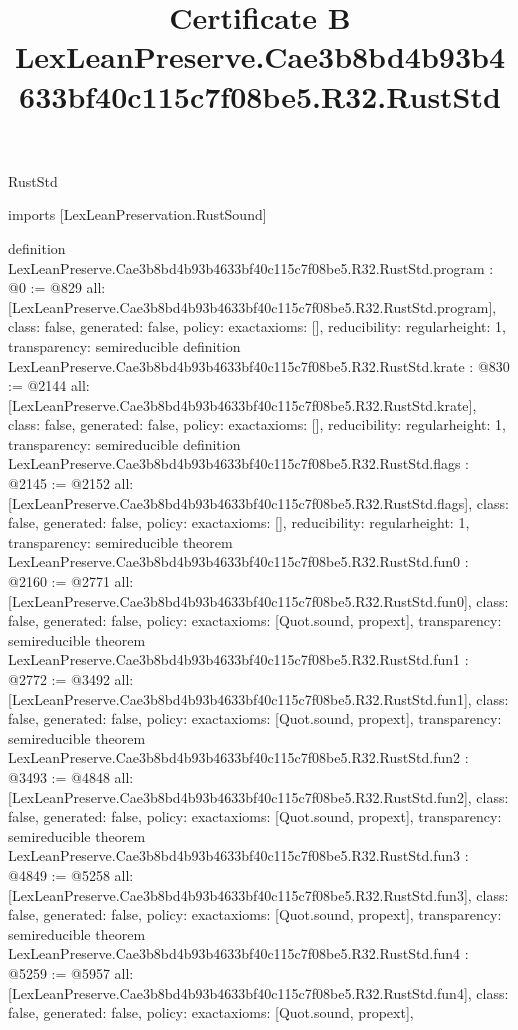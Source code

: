 \begin{lexlean}{RustStd}
\title{Certificate B LexLeanPreserve.Cae3b8bd4b93b4633bf40c115c7f08be5.R32.RustStd}
\begin{coremodule}
imports [LexLeanPreservation.RustSound]

definition LexLeanPreserve.Cae3b8bd4b93b4633bf40c115c7f08be5.R32.RustStd.program : @0 := @829 {
  all: [LexLeanPreserve.Cae3b8bd4b93b4633bf40c115c7f08be5.R32.RustStd.program],
  class: false,
  generated: false,
  policy: exact{axioms: []},
  reducibility: regular{height: 1},
  transparency: semireducible
}
definition LexLeanPreserve.Cae3b8bd4b93b4633bf40c115c7f08be5.R32.RustStd.krate : @830 := @2144 {
  all: [LexLeanPreserve.Cae3b8bd4b93b4633bf40c115c7f08be5.R32.RustStd.krate],
  class: false,
  generated: false,
  policy: exact{axioms: []},
  reducibility: regular{height: 1},
  transparency: semireducible
}
definition LexLeanPreserve.Cae3b8bd4b93b4633bf40c115c7f08be5.R32.RustStd.flags : @2145 := @2152 {
  all: [LexLeanPreserve.Cae3b8bd4b93b4633bf40c115c7f08be5.R32.RustStd.flags],
  class: false,
  generated: false,
  policy: exact{axioms: []},
  reducibility: regular{height: 1},
  transparency: semireducible
}
theorem LexLeanPreserve.Cae3b8bd4b93b4633bf40c115c7f08be5.R32.RustStd.fun0 : @2160 := @2771 {
  all: [LexLeanPreserve.Cae3b8bd4b93b4633bf40c115c7f08be5.R32.RustStd.fun0],
  class: false,
  generated: false,
  policy: exact{axioms: [Quot.sound, propext]},
  transparency: semireducible
}
theorem LexLeanPreserve.Cae3b8bd4b93b4633bf40c115c7f08be5.R32.RustStd.fun1 : @2772 := @3492 {
  all: [LexLeanPreserve.Cae3b8bd4b93b4633bf40c115c7f08be5.R32.RustStd.fun1],
  class: false,
  generated: false,
  policy: exact{axioms: [Quot.sound, propext]},
  transparency: semireducible
}
theorem LexLeanPreserve.Cae3b8bd4b93b4633bf40c115c7f08be5.R32.RustStd.fun2 : @3493 := @4848 {
  all: [LexLeanPreserve.Cae3b8bd4b93b4633bf40c115c7f08be5.R32.RustStd.fun2],
  class: false,
  generated: false,
  policy: exact{axioms: [Quot.sound, propext]},
  transparency: semireducible
}
theorem LexLeanPreserve.Cae3b8bd4b93b4633bf40c115c7f08be5.R32.RustStd.fun3 : @4849 := @5258 {
  all: [LexLeanPreserve.Cae3b8bd4b93b4633bf40c115c7f08be5.R32.RustStd.fun3],
  class: false,
  generated: false,
  policy: exact{axioms: [Quot.sound, propext]},
  transparency: semireducible
}
theorem LexLeanPreserve.Cae3b8bd4b93b4633bf40c115c7f08be5.R32.RustStd.fun4 : @5259 := @5957 {
  all: [LexLeanPreserve.Cae3b8bd4b93b4633bf40c115c7f08be5.R32.RustStd.fun4],
  class: false,
  generated: false,
  policy: exact{axioms: [Quot.sound, propext]},
}
\end{coremodule}
\end{lexlean}
